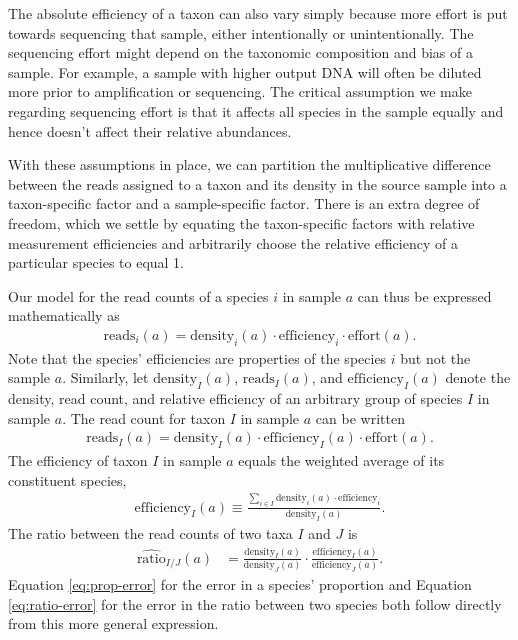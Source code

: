 \documentclass[
]{article}
\begin{document}
The absolute efficiency of a taxon can also vary simply because more effort is put towards sequencing that sample, either intentionally or unintentionally.
The sequencing effort might depend on the taxonomic composition and bias of a sample.
For example, a sample with higher output DNA will often be diluted more prior to amplification or sequencing.
The critical assumption we make regarding sequencing effort is that it affects all species in the sample equally and hence doesn't affect their relative abundances.

With these assumptions in place, we can partition the multiplicative difference between the reads assigned to a taxon and its density in the source sample into a taxon-specific factor and a sample-specific factor.
There is an extra degree of freedom, which we settle by equating the taxon-specific factors with relative measurement efficiencies and arbitrarily choose the relative efficiency of a particular species to equal 1.

Our model for the read counts of a species \(i\) in sample \(a\) can thus be expressed mathematically as
\begin{align}
  \text{reads}_{i}(a)
  = \text{density}_{i}(a) \cdot \text{efficiency}_{i} \cdot \text{effort}(a).
\end{align}
Note that the species' efficiencies are properties of the species \(i\) but not the sample \(a\).
Similarly, let \(\text{density}_{I}(a)\), \(\text{reads}_{I}(a)\), and \(\text{efficiency}_{I}(a)\) denote the density, read count, and relative efficiency of an arbitrary group of species \(I\) in sample \(a\).
The read count for taxon \(I\) in sample \(a\) can be written
\begin{align}
  \label{eq:measurement-model-general}
  \text{reads}_{I}(a)
  = \text{density}_{I}(a) \cdot \text{efficiency}_{I}(a) \cdot \text{effort}(a).
\end{align}
The efficiency of taxon \(I\) in sample \(a\) equals the weighted average of its constituent species,
\begin{align}
  \label{eq:efficiency-general}
  \text{efficiency}_I(a) 
  \equiv \frac{\sum_{i\in I}\text{density}_i(a)\cdot \text{efficiency}_i}{\text{density}_I(a)}.
\end{align}
The ratio between the read counts of two taxa \(I\) and \(J\) is
\begin{align}
  \label{eq:ratio-error-general}
  \widehat{\text{ratio}}_{I/J}(a)
  &= \frac{\text{density}_{I}(a)}{\text{density}_{J}(a)} \cdot \frac{\text{efficiency}_{I}(a)}{\text{efficiency}_{J}(a)}.
\end{align}
Equation \eqref{eq:prop-error} for the error in a species' proportion and Equation \eqref{eq:ratio-error} for the error in the ratio between two species both follow directly from this more general expression.
\end{document}
